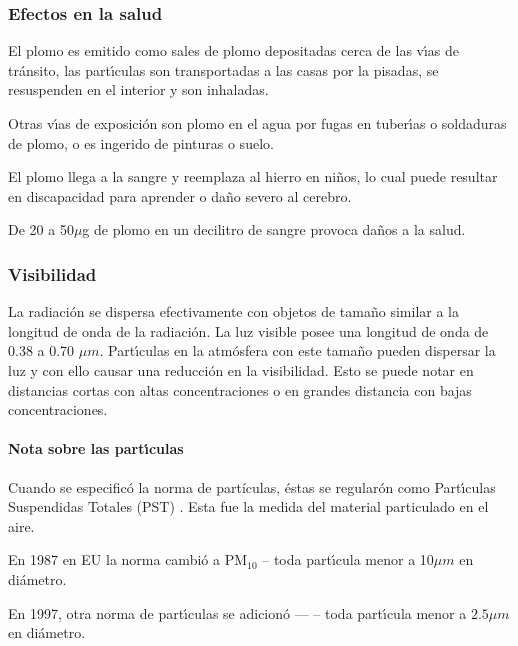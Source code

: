 \subsubsection{Efectos en la salud}
El plomo es emitido como sales de plomo depositadas cerca de las v\'{\i}as de tr\'ansito, las
part\'{\i}culas son transportadas a las casas por la pisadas, se resuspenden en el
interior y son inhaladas.

Otras v\'{\i}as de exposici\'on son plomo en el agua por fugas en tuber\'{\i}as o
soldaduras de plomo,  o es ingerido de pinturas o suelo.

El plomo llega a la sangre y reemplaza al hierro en ni\~nos, lo cual puede resultar en
discapacidad para aprender o da\~no severo al cerebro.

De 20 a 50$\mu$g de plomo en un decilitro de sangre provoca da\~nos a la salud.

\subsubsection{Visibilidad}

La radiaci\'on se dispersa efectivamente con objetos de tama\~no similar a la longitud
de onda de la radiaci\'on. La luz visible posee una longitud de onda de 0.38 a 0.70
$\mu m$. Part\'{\i}culas en la atm\'osfera con este tama\~no pueden dispersar la luz y
con ello causar una reducci\'on en la visibilidad. Esto se puede notar en distancias
cortas con altas concentraciones o en grandes distancia con bajas concentraciones.
\paragraph{Nota sobre las part\'{\i}culas}
Cuando se especific\'o la norma de partículas, \'estas se regular\'on como Part\'{\i}culas Suspendidas Totales (PST) . Esta fue la medida del material particulado en el aire.

En 1987 en EU la norma cambi\'o a PM$_{10}$ -- toda part\'{\i}cula menor a 10$\mu m$ en di\'ametro.

En 1997, otra norma de part\'{\i}culas se adicion\'o ---  -- toda part\'{\i}cula menor a $2.5\mu m$ en di\'ametro.

